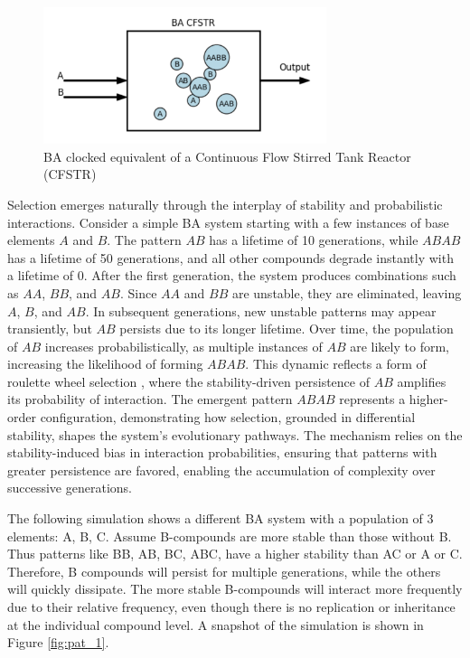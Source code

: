 \documentclass[entropy,article,submit,pdftex,moreauthors]{Definitions/mdpi}
\begin{document}
\begin{figure}[htp]
    \centering
    \includegraphics[height=4cm]{ba_cfstr}
    \caption{BA clocked equivalent of a Continuous Flow Stirred Tank Reactor (CFSTR)}
    \label{fig:ba_cfstr}
\end{figure}

Selection emerges naturally through the interplay of stability and probabilistic interactions. Consider a simple BA system starting with a few instances of base elements \( A \) and \( B \). The pattern \( AB \) has a lifetime of 10 generations, while \( ABAB \) has a lifetime of 50 generations, and all other compounds degrade instantly with a lifetime of 0. After the first generation, the system produces combinations such as \( AA \), \( BB \), and \( AB \). Since \( AA \) and \( BB \) are unstable, they are eliminated, leaving \( A \), \( B \), and \( AB \). In subsequent generations, new unstable patterns may appear transiently, but \( AB \) persists due to its longer lifetime. Over time, the population of \( AB \) increases probabilistically, as multiple instances of \( AB \) are likely to form, increasing the likelihood of forming \( ABAB \). This dynamic reflects a form of roulette wheel selection \cite{goldberg1989genetic} \cite{holland1975adaptation}, where the stability-driven persistence of \( AB \) amplifies its probability of interaction. The emergent pattern \( ABAB \) represents a higher-order configuration, demonstrating how selection, grounded in differential stability, shapes the system's evolutionary pathways. The mechanism relies on the stability-induced bias in interaction probabilities, ensuring that patterns with greater persistence are favored, enabling the accumulation of complexity over successive generations.

The following simulation shows a different BA system with a population of 3 elements: {A, B, C}. Assume B-compounds are more stable than those without B. Thus patterns like BB, AB, BC, ABC, have a higher stability than AC or A or C. Therefore, B compounds will persist for multiple generations, while the others will quickly dissipate. The more stable B-compounds will interact more frequently due to their relative frequency, even though there is no replication or inheritance at the individual compound level. A snapshot of the simulation is shown in Figure \ref{fig:pat_1}.
\end{document}
